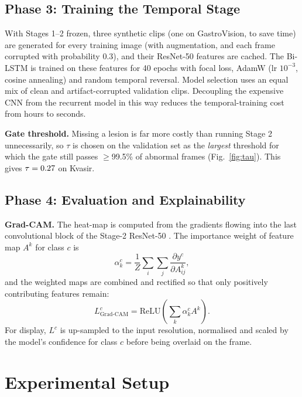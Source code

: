\documentclass[conference]{IEEEtran}
\begin{document}
\subsection{Phase 3: Training the Temporal Stage}
With Stages 1--2 frozen, three synthetic clips (one on GastroVision, to save time) are generated for every training image (with augmentation, and each
frame corrupted with probability 0.3), and their ResNet-50 features are cached. The Bi-LSTM is trained on these
features for 40 epochs with focal loss, AdamW (lr $10^{-3}$, cosine annealing) and random temporal reversal. Model
selection uses an equal mix of clean and artifact-corrupted validation clips. Decoupling the expensive CNN from the
recurrent model in this way reduces the temporal-training cost from hours to seconds.

\textbf{Gate threshold.} Missing a lesion is far more costly than running Stage 2 unnecessarily, so $\tau$ is chosen
on the validation set as the \emph{largest} threshold for which the gate still passes $\ge$99.5\% of abnormal frames
(Fig.~\ref{fig:tau}). This gives $\tau=0.27$ on Kvasir.

\subsection{Phase 4: Evaluation and Explainability}
\textbf{Grad-CAM.} The heat-map is computed from the gradients flowing into the last convolutional block of the
Stage-2 ResNet-50 \cite{selvaraju2017grad}. The importance weight of feature map $A^k$ for class $c$ is
\begin{equation}
    \alpha_k^c = \frac{1}{Z} \sum_i \sum_j \frac{\partial y^c}{\partial A_{ij}^k},
\end{equation}
and the weighted maps are combined and rectified so that only positively contributing features remain:
\begin{equation}
    L_{\text{Grad-CAM}}^c = \text{ReLU} \left( \sum_k \alpha_k^c A^k \right).
\end{equation}
For display, $L^c$ is up-sampled to the input resolution, normalised and scaled by the model's confidence for class
$c$ before being overlaid on the frame.

\section{Experimental Setup}
\label{sec:setup}
\end{document}

